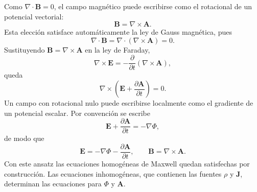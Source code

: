 \documentclass[11pt]{article}
\newcommand{\vb}[1]{\mathbf{#1}}
\begin{document}
Como $\nabla\cdot\vb B=0$, el campo magn\'etico puede escribirse como el
rotacional de un potencial vectorial:
\begin{equation}
  \vb B=\nabla\times\vb A.
\end{equation}
Esta elecci\'on satisface autom\'aticamente la ley de Gauss magn\'etica, pues
\begin{equation}
  \nabla\cdot\vb B
  =
  \nabla\cdot(\nabla\times\vb A)
  =
  0.
\end{equation}
Sustituyendo $\vb B=\nabla\times\vb A$ en la ley de Faraday,
\begin{equation}
  \nabla\times\vb E
  =
  -\frac{\partial}{\partial t}
  (\nabla\times\vb A),
\end{equation}
queda
\begin{equation}
  \nabla\times
  \left(
  \vb E+\frac{\partial\vb A}{\partial t}
  \right)
  =
  0.
\end{equation}
Un campo con rotacional nulo puede escribirse localmente como el gradiente de
un potencial escalar. Por convenci\'on se escribe
\begin{equation}
  \vb E+\frac{\partial\vb A}{\partial t}
  =
  -\nabla\Phi,
\end{equation}
de modo que
\begin{equation}
  \boxed{
  \vb E=-\nabla\Phi-\frac{\partial\vb A}{\partial t},
  \qquad
  \vb B=\nabla\times\vb A.
  }
\end{equation}
Con este ansatz las ecuaciones homog\'eneas de Maxwell quedan satisfechas por
construcci\'on. Las ecuaciones inhomog\'eneas, que contienen las fuentes
$\rho$ y $\vb J$, determinan las ecuaciones para $\Phi$ y $\vb A$.
\end{document}
